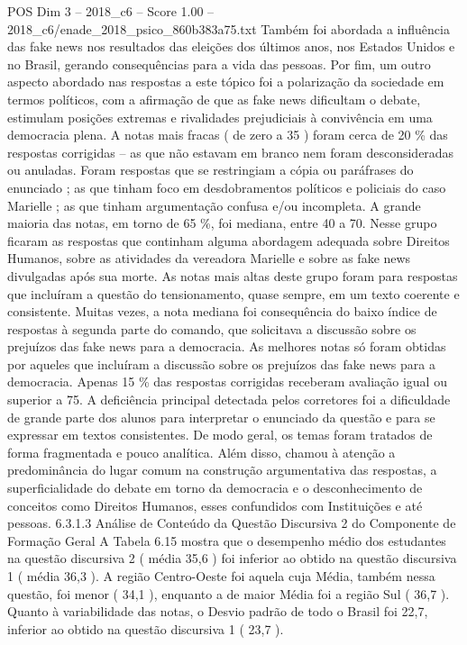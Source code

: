 \begin{textsample}{POS Dim 3 – 2018\_c6 – Score 1.00 – 2018\_c6/enade\_2018\_psico\_860b383a75.txt}
Também foi abordada a influência das fake news nos resultados das eleições dos últimos anos, nos Estados Unidos e no Brasil, gerando consequências para a vida das pessoas.
Por fim, um outro aspecto abordado nas respostas a este tópico foi a polarização da sociedade em termos políticos, com a afirmação de que as fake news dificultam o debate, estimulam posições extremas e rivalidades prejudiciais à convivência em uma democracia plena.
A notas mais fracas ( de zero a 35 ) foram cerca de 20 \% das respostas corrigidas – as que não estavam em branco nem foram desconsideradas ou anuladas.
Foram respostas que se restringiam a cópia ou paráfrases do enunciado ; as que tinham foco em desdobramentos políticos e policiais do caso Marielle ; as que tinham argumentação confusa e/ou incompleta.
A grande maioria das notas, em torno de 65 \%, foi mediana, entre 40 a 70.
Nesse grupo ficaram as respostas que continham alguma abordagem adequada sobre Direitos Humanos, sobre as atividades da vereadora Marielle e sobre as fake news divulgadas após sua morte.
As notas mais altas deste grupo foram para respostas que incluíram a questão do tensionamento, quase sempre, em um texto coerente e consistente.
Muitas vezes, a nota mediana foi consequência do baixo índice de respostas à segunda parte do comando, que solicitava a discussão sobre os prejuízos das fake news para a democracia.
As melhores notas só foram obtidas por aqueles que incluíram a discussão sobre os prejuízos das fake news para a democracia.
Apenas 15 \% das respostas corrigidas receberam avaliação igual ou superior a 75.
A deficiência principal detectada pelos corretores foi a dificuldade de grande parte dos alunos para interpretar o enunciado da questão e para se expressar em textos consistentes.
De modo geral, os temas foram tratados de forma fragmentada e pouco analítica.
Além disso, chamou à atenção a predominância do lugar comum na construção argumentativa das respostas, a superficialidade do debate em torno da democracia e o desconhecimento de conceitos como Direitos Humanos, esses confundidos com Instituições e até pessoas. 6.3.1.3 Análise de Conteúdo da Questão Discursiva 2 do Componente de Formação Geral A Tabela 6.15 mostra que o desempenho médio dos estudantes na questão discursiva 2 ( média 35,6 ) foi inferior ao obtido na questão discursiva 1 ( média 36,3 ).
A região Centro-Oeste foi aquela cuja Média, também nessa questão, foi menor ( 34,1 ), enquanto a de maior Média foi a região Sul ( 36,7 ).
Quanto à variabilidade das notas, o Desvio padrão de todo o Brasil foi 22,7, inferior ao obtido na questão discursiva 1 ( 23,7 ).

\end{textsample}
